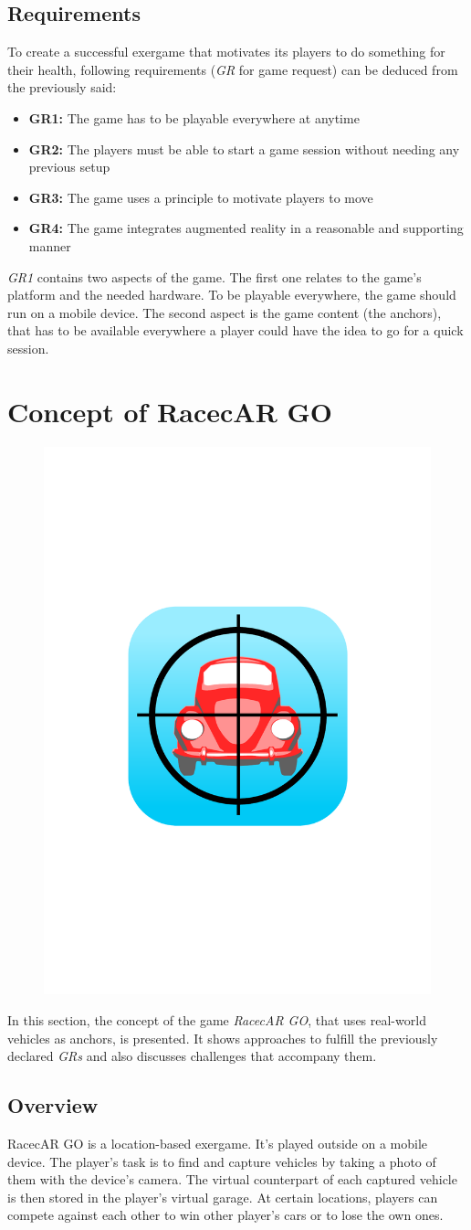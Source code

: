 \subsection{Requirements}
To create a successful exergame that motivates its players to do something for their health, following requirements (\emph{GR} for game request) can be deduced from the previously said:
\begin{itemize}
  \item\textbf{GR1:} The game has to be playable everywhere at anytime
  \item\textbf{GR2:} The players must be able to start a game session without needing any previous setup
  \item\textbf{GR3:} The game uses a principle to motivate players to move
  \item\textbf{GR4:} The game integrates augmented reality in a reasonable and supporting manner
\end{itemize}
\emph{GR1} contains two aspects of the game. The first one relates to the game's platform and the needed hardware. To be playable everywhere, the game should run on a mobile device. The second aspect is the game content (the anchors), that has to be available everywhere a player could have the idea to go for a quick session.


\section{Concept of RacecAR GO}
\begin{figure}[bth]
  \centering
        \includegraphics[width=.25\linewidth]{gfx/app_icon}
\end{figure}

In this section, the concept of the game \emph{RacecAR GO}, that uses real-world vehicles as anchors, is presented. It shows approaches to fulfill the previously declared \emph{GRs} and also discusses challenges that accompany them.

\subsection{Overview}
RacecAR GO is a location-based exergame. It's played outside on a mobile device. The player's task is to find and capture vehicles by taking a photo of them with the device's camera. The virtual counterpart of each captured vehicle is then stored in the player's virtual garage. At certain locations, players can compete against each other to win other player's cars or to lose the own ones.

